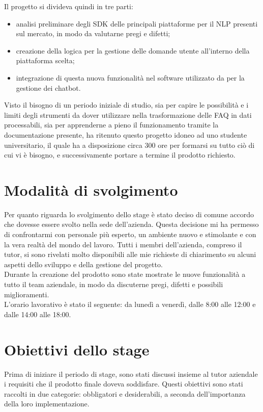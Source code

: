 Il progetto si divideva quindi in tre parti:
\begin{itemize}
	\item analisi preliminare degli \gls{SDK} delle principali piattaforme per il \gls{NLP} presenti sul mercato, in modo da valutarne pregi e difetti;
	\item creazione della logica per la gestione delle domande utente all'interno della piattaforma scelta;
	\item integrazione di questa nuova funzionalità nel software utilizzato da \azienda{} per la gestione dei \gls{chatbot}. 
\end{itemize}
Visto il bisogno di un periodo iniziale di studio, sia per capire le possibilità e i limiti degli strumenti da dover utilizzare nella trasformazione delle \gls{FAQ} in dati processabili, sia per apprenderne a pieno il funzionamento tramite la documentazione presente, \azienda{} ha ritenuto questo progetto idoneo ad uno studente universitario, il quale ha a disposizione circa 300 ore per formarsi su tutto ciò di cui vi è bisogno, e successivamente portare a termine il prodotto richiesto.

\section{Modalità di svolgimento}
Per quanto riguarda lo svolgimento dello stage è stato deciso di comune accordo che dovesse essere svolto nella sede dell'azienda. Questa decisione mi ha permesso di confrontarmi con personale più esperto, un ambiente nuovo e stimolante e con la vera realtà del mondo del lavoro. Tutti i membri dell'azienda, compreso il tutor, si sono rivelati molto disponibili alle mie richieste di chiarimento su alcuni aspetti dello sviluppo e della gestione del progetto.\\
Durante la creazione del prodotto sono state mostrate le nuove funzionalità a tutto il team aziendale, in modo da discuterne pregi, difetti e possibili miglioramenti. \\
L'orario lavorativo è stato il seguente: da lunedì a venerdì, dalle 8:00 alle 12:00 e dalle 14:00 alle 18:00.

\section{Obiettivi dello stage}
\label{obiettivi}
Prima di iniziare il periodo di stage, sono stati discussi insieme al tutor aziendale i requisiti che il prodotto finale doveva soddisfare. Questi obiettivi sono stati raccolti in due categorie: obbligatori e desiderabili, a seconda dell'importanza della loro implementazione.

